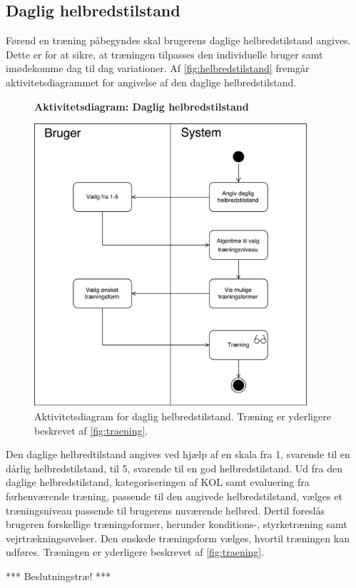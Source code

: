 \subsection*{Daglig helbredstilstand}
Førend en træning påbegyndes skal brugerens daglige helbredstilstand angives. Dette er for at sikre, at træningen tilpasses den individuelle bruger samt imødekomme dag til dag variationer. Af \autoref{fig:helbredstilstand} fremgår aktivitetsdiagrammet for angivelse af den daglige helbredstilstand. 

\begin{figure} [H]
\centering
\textbf{Aktivitetsdiagram: Daglig helbredstilstand}\par\medskip
\includegraphics[width=0.9\textwidth]{figures/aktivitetsdiagram/Helbredstilstand}
\caption{Aktivitetsdiagram for daglig helbredstilstand. Træning er yderligere beskrevet af \autoref{fig:traening}.}
\label{fig:helbredstilstand}
\end{figure}

\noindent
Den daglige helbredtilstand angives ved hjælp af en skala fra 1, svarende til en dårlig helbredstilstand, til 5, svarende til en god helbredstilstand. Ud fra den daglige helbredstilstand, kategoriseringen af KOL samt evaluering fra førhenværende træning, passende til den angivede helbredstilstand, vælges et træningsniveau passende til brugerens nuværende helbred. Dertil foreslås brugeren forskellige træningsformer, herunder konditions-, styrketræning samt vejrtrækningsøvelser. Den ønskede træningsform vælges, hvortil træningen kan udføres. Træningen er yderligere beskrevet af \autoref{fig:traening}. 


*** Beslutningstræ! ***